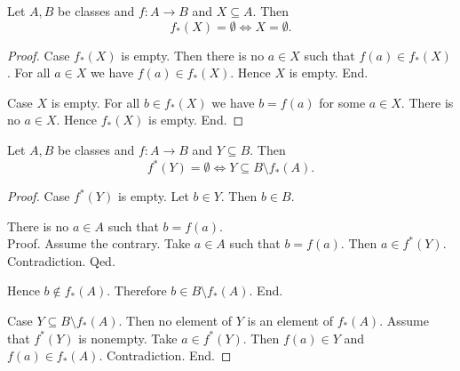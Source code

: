\documentclass[../set-theory.tex]{subfiles}
\begin{document}
  \begin{forthel}
    \begin{proposition}
      Let $A, B$ be classes and $f : A \to B$ and $X \subseteq A$.
      Then \[ f_{*}(X) = \emptyset \iff X = \emptyset. \]
    \end{proposition}
    \begin{proof}
      Case $f_{*}(X)$ is empty.
        Then there is no $a \in X$ such that $f(a) \in f_{*}(X)$.
        For all $a \in X$ we have $f(a) \in f_{*}(X)$.
        Hence $X$ is empty.
      End.

      Case $X$ is empty.
        For all $b \in f_{*}(X)$ we have $b = f(a)$ for some $a \in X$.
        There is no $a \in X$.
        Hence $f_{*}(X)$ is empty.
      End.
    \end{proof}
  \end{forthel}

  \begin{forthel}
    \begin{proposition}
      Let $A, B$ be classes and $f : A \to B$ and $Y \subseteq B$.
      Then \[ f^{*}(Y) = \emptyset \iff Y \subseteq B \setminus f_{*}(A). \]
    \end{proposition}
    \begin{proof}
      Case $f^{*}(Y)$ is empty.
        Let $b \in Y$.
        Then $b \in B$.

        There is no $a \in A$ such that $b = f(a)$. \\
        Proof.
          Assume the contrary.
          Take $a \in A$ such that $b = f(a)$.
          Then $a \in f^{*}(Y)$.
          Contradiction.
        Qed.

        Hence $b \notin f_{*}(A)$.
        Therefore $b \in B \setminus f_{*}(A)$.
      End.

      Case $Y \subseteq B \setminus f_{*}(A)$.
        Then no element of $Y$ is an element of $f_{*}(A)$.
        Assume that $f^{*}(Y)$ is nonempty.
        Take $a \in f^{*}(Y)$.
        Then $f(a) \in Y$ and $f(a) \in f_{*}(A)$.
        Contradiction.
      End.
    \end{proof}
  \end{forthel}
\end{document}
